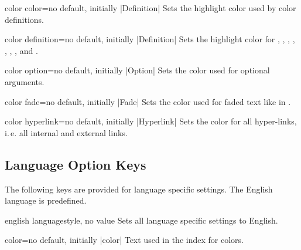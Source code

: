 \begin{docTcbKey}{color color}{=}{no default, initially |Definition|}
  Sets the highlight color used by color definitions.
\end{docTcbKey}

\begin{docTcbKey}[][doc updated={2019-09-18}]{color definition}{=}{no default, initially |Definition|}
  Sets the highlight color for , ,
  , , , ,
  , and .
\end{docTcbKey}

\begin{docTcbKey}{color option}{=}{no default, initially |Option|}
  Sets the color used for optional arguments.
\end{docTcbKey}

\begin{docTcbKey}{color fade}{=}{no default, initially |Fade|}
  Sets the color used for faded text like 
  in .
\end{docTcbKey}


\begin{docTcbKey}{color hyperlink}{=}{no default, initially |Hyperlink|}
  Sets the color for all hyper-links, i.\,e. all internal and external links.
\end{docTcbKey}


\clearpage
\subsection{Language Option Keys}

The following keys are provided for language specific settings.
The English language is predefined.

\begin{docTcbKey}{english language}{}{style, no value}
  Sets all language specific settings to English.
\end{docTcbKey}

\begin{langTcbKey}{color}{=}{no default, initially |color|}
  Text used in the index for colors.
\end{langTcbKey}

